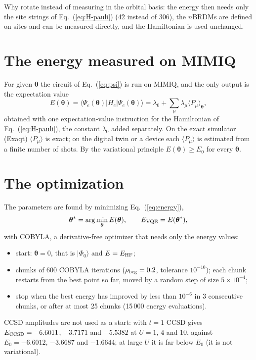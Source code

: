 \documentclass[11pt,a4paper]{article}
\begin{document}
Why rotate instead of measuring in the orbital basis: the energy
then needs only the site strings of Eq.~(\ref{eq:H-pauli}) (42 instead of 306),
the $n$BRDMs are defined on sites and can be measured directly, and the
Hamiltonian is used unchanged.

\section{The energy measured on MIMIQ}\label{sec:energy}

For given $\boldsymbol\theta$ the circuit of Eq.~(\ref{eq:psi}) is run on
MIMIQ, and the only output is the expectation value
\begin{equation}\label{eq:energy}
  E(\boldsymbol\theta) = \langle \Psi_e(\boldsymbol\theta) | H_e | \Psi_e(\boldsymbol\theta) \rangle
  = \lambda_0 + \sum_\mu \lambda_\mu \langle P_\mu \rangle_{\boldsymbol\theta} ,
\end{equation}
obtained with one expectation-value instruction for the Hamiltonian of
Eq.~(\ref{eq:H-pauli}), the constant $\lambda_0$ added
separately. On the exact simulator (Exaqt) $\langle P_\mu\rangle$ is exact; on
the digital twin or a device each $\langle P_\mu\rangle$ is estimated from a
finite number of shots. By the variational principle
$E(\boldsymbol\theta) \ge E_0$ for every $\boldsymbol\theta$.

\section{The optimization}\label{sec:opt}

The parameters are found by minimizing Eq.~(\ref{eq:energy}),
\begin{equation}
  \boldsymbol\theta^* = \arg\min_{\boldsymbol\theta} E(\boldsymbol\theta) ,
  \qquad E_{\rm VQE} = E(\boldsymbol\theta^*) ,
\end{equation}
with COBYLA, a derivative-free optimizer that needs only the energy values:
\begin{itemize}
  \item start: $\boldsymbol\theta = 0$, that is $|\Phi_0\rangle$ and
    $E = E_{\rm HF}$;
  \item chunks of 600 COBYLA iterations ($\rho_{\rm beg} = 0.2$, tolerance
    $10^{-10}$); each chunk restarts from the best point so far, moved by a
    random step of size $5\times10^{-4}$;
  \item stop when the best energy has improved by less than $10^{-6}$ in 3
    consecutive chunks, or after at most 25 chunks (15\,000 energy evaluations).
\end{itemize}
CCSD amplitudes are not used as a start: with $t = 1$ CCSD gives
$E_{\rm CCSD} = -6.6011$, $-3.7171$ and $-5.5382$ at $U = 1$, $4$ and $10$,
against $E_0 = -6.6012$, $-3.6687$ and $-1.6644$; at large $U$ it is far below
$E_0$ (it is not variational).
\end{document}

